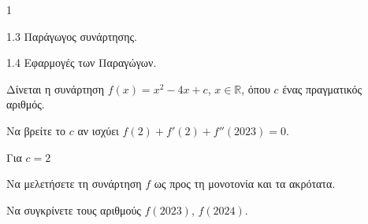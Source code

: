 \begin{ylh}{1}
	\item 1.3 Παράγωγος συνάρτησης.
	\item 1.4 Εφαρμογές των Παραγώγων.
\end{ylh}
Δίνεται η συνάρτηση $f(x) = x^2 - 4x + c$, $x \in \mathbb{R}$, όπου $c$ ένας πραγματικός αριθμός.
\begin{alist}
	\item Να βρείτε το $c$ αν ισχύει $f(2) + f'(2) + f''(2023) = 0$. 
	
	Για $c=2$
	
	\item Να μελετήσετε τη συνάρτηση $f$ ως προς τη μονοτονία και τα ακρότατα. 
	
	\item Να συγκρίνετε τους αριθμούς $f(2023)$, $f(2024)$. 
\end{alist}

